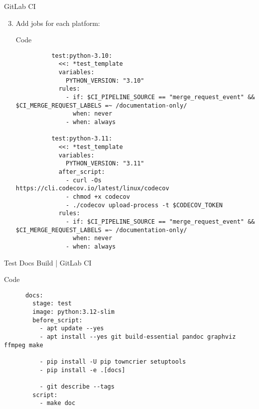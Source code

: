 \begin{frame}[fragile]{GitLab CI}
  \begin{enumerate}
    \setcounter{enumi}{2}
    \item Add jobs for each platform:
      \begin{block}{Code}
        \footnotesize
        \begin{verbatim}
          test:python-3.10:
            <<: *test_template
            variables:
              PYTHON_VERSION: "3.10"
            rules:
              - if: $CI_PIPELINE_SOURCE == "merge_request_event" && $CI_MERGE_REQUEST_LABELS =~ /documentation-only/
                when: never
              - when: always

          test:python-3.11:
            <<: *test_template
            variables:
              PYTHON_VERSION: "3.11"
            after_script:
              - curl -Os https://cli.codecov.io/latest/linux/codecov
              - chmod +x codecov
              - ./codecov upload-process -t $CODECOV_TOKEN
            rules:
              - if: $CI_PIPELINE_SOURCE == "merge_request_event" && $CI_MERGE_REQUEST_LABELS =~ /documentation-only/
                when: never
              - when: always
        \end{verbatim}
      \end{block}
  \end{enumerate}
\end{frame}

\begin{frame}[fragile]{Test Docs Build | GitLab CI}
  \begin{block}{Code}
    \footnotesize
    \begin{verbatim}
      docs:
        stage: test
        image: python:3.12-slim
        before_script:
          - apt update --yes
          - apt install --yes git build-essential pandoc graphviz ffmpeg make
          
          - pip install -U pip towncrier setuptools
          - pip install -e .[docs]
          
          - git describe --tags
        script:
          - make doc
      \end{verbatim}
   \end{block}
\end{frame}

